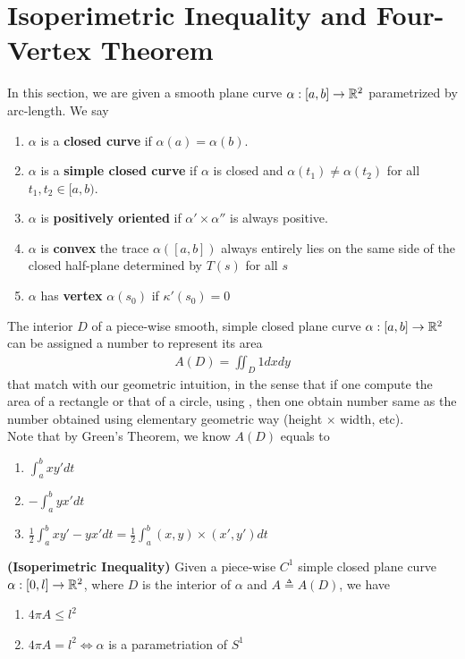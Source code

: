 \documentclass{report}
\begin{document}
\section{Isoperimetric Inequality and Four-Vertex Theorem}
\begin{mdframed}
  In this section, we are given a smooth plane curve $\alpha :[a,b]\rightarrow \mathbb{R}^2$ parametrized by arc-length. We say
\begin{enumerate}[label=(\alph*)]
  \item $\alpha $ is a \textbf{closed curve} if $\alpha(a)=\alpha(b)$. 
\item  $\alpha $ is a \textbf{simple closed curve} if $\alpha $ is closed and $\alpha (t_1)\neq \alpha (t_2)$ for all $t_1,t_2 \in [a,b)$.
\item  $\alpha $ is \textbf{positively oriented} if $\alpha ' \times \alpha ''$ is always positive.  
\item $\alpha $ is \textbf{convex} the trace $\alpha ([a,b])$ always entirely lies on the same side of the closed half-plane determined by $T(s)$ for all $s$ 
\item $\alpha $ has \textbf{vertex} $\alpha (s_0)$ if $\kappa'(s_0)=0$ 
\end{enumerate}
The interior $D$ of a piece-wise smooth, simple closed plane curve $\alpha :[a,b]\rightarrow \mathbb{R}^2$ can be assigned a number to represent its area 
\begin{align}
\label{A(D)}
A(D)=\iint_D 1dxdy
\end{align}
that match with our geometric intuition, in the sense that if one compute the area of a rectangle or that of a circle, using , then one obtain number same as the number obtained using elementary geometric way (height $\times $ width, etc).\\ 

Note that by Green's Theorem, we know $A(D)$ equals to 
\begin{enumerate}[label=(\alph*)]
  \item $\int_a^b xy'dt$ 
  \item $-\int_a^b yx'dt$
  \item $\frac{1}{2}\int_a^b xy'-yx'dt=\frac{1}{2}\int_a^b (x,y)\times (x',y')dt$
\end{enumerate}
\end{mdframed}
\begin{theorem}
\textbf{(Isoperimetric Inequality)} Given a piece-wise $C^1$ simple closed plane curve $\alpha :[0,l]\rightarrow \mathbb{R}^2$, where $D$ is the interior of $\alpha $ and $A\triangleq A(D)$, we have 
\begin{enumerate}[label=(\alph*)]
  \item $4 \pi A\leq l^2$
  \item $4 \pi A=l^2 \iff \alpha $ is a parametriation of $S^1$
\end{enumerate}
\end{theorem}
\end{document}
